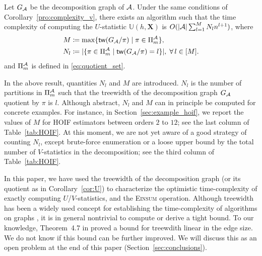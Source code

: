 \documentclass[letterpaper,11pt]{article}
\def\Einsum{\textsc{Einsum}}
\newcommand{\ustat}{\mathbb{U}}
\newcommand{\ustatp}[2]{\ustat(#1,#2)}
\newcommand{\partition}{\Pi}
\newcommand{\partitionp}[1]{\partition_{#1}}
\newcommand{\treewidthp}[1]{\mathsf{tw}(#1)}
\newcommand{\less}{O}
\begin{document}
\begin{bibunit}[plainnat]
\begin{corollary}
\label{cor:U}
Let $G_{\mathcal{A}}$ be the decomposition graph of ${\mathcal{A}}$.
Under the same conditions of Corollary~\ref{pro:complexity_v}, there exists an algorithm such that the time complexity of computing the $U$-statistic $\ustatp{h}{\bm{X}}$ is $\less(|\calA| \sum_{l = 1}^{M} N_{l} n^{l + 1})$, where 
\begin{align*}
M  & \coloneqq \max\{\treewidthp{G_\calA /\pi} \mid \pi \in \partitionp{m}^\calA \}, \\
N_{l} & \coloneqq |\{\pi \in \Pi_{m}^{\calA} \mid \treewidthp{G_{\calA} / \pi} = l\}|, \; \forall \, l 
\in [M].
\end{align*}
and $\partitionp{m}^\calA$ is defined in \eqref{eq:quotient_set}.
\end{corollary}

\begin{remark}
\label{rem:U-complexity}
In the above result, quantities $N_{l}$ and $M$ are introduced. $N_{l}$ is the number of partitions in $\Pi_{m}^{{\mathcal{A}}}$ such that the treewidth of the decomposition graph $G_{{\mathcal{A}}}$ quotient by $\pi$ is $l$. Although abstract, $N_{l}$ and $M$ can in principle be computed for concrete examples. For instance, in Section~\ref{sec:example_hoif}, we report the values of $M$ for HOIF estimators between orders $2$ to $12$; see the last column of Table~\ref{tab:HOIF}. At this moment, we are not yet aware of a good strategy of counting $N_{l}$, except brute-force enumeration or a loose upper bound by the total number of $V$-statistics in the decomposition; see the third column of Table~\ref{tab:HOIF}.
\end{remark}



\begin{remark}
\label{rem:tw}
In this paper, we have used the treewidth of the decomposition graph (or its quotient as in Corollary~\ref{cor:U}) to characterize the optimistic time-complexity of exactly computing $U$/$V$-statistics, and the \Einsum{} operation. Although treewidth has been a widely used concept for establishing the time-complexity of algorithms on graphs \citep{dong2021nearly}, it is in general nontrivial to compute or derive a tight bound. To our knowledge, Theorem~4.7 in \cite{kneis2009bound} proved a bound for treewdith linear in the edge size. We do not know if this bound can be further improved. We will discuss this as an open problem at the end of this paper (Section~\ref{sec:conclusions}).
\end{remark}


\end{bibunit}
\end{document}
